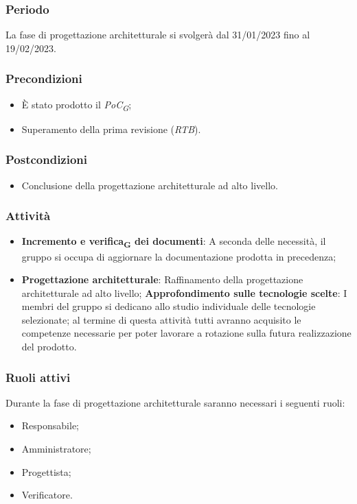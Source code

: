 \subsubsection{Periodo}
La fase di progettazione architetturale si svolgerà dal 31/01/2023 fino al 19/02/2023.

\subsubsection{Precondizioni}\:
\begin{itemize}
    \item È stato prodotto il \textit{PoC\textsubscript{G}};
    \item Superamento della prima revisione (\textit{RTB}).
\end{itemize}

\subsubsection{Postcondizioni}\:
\begin{itemize}
    \item Conclusione della progettazione architetturale ad alto livello.
\end{itemize}

\subsubsection{Attività}\:
\begin{itemize}
    \item \textbf{Incremento e verifica\textsubscript{G} dei documenti}: A seconda delle necessità, il gruppo si occupa di aggiornare la documentazione prodotta in precedenza;
    \item \textbf{Progettazione architetturale}: Raffinamento della progettazione architetturale ad alto livello;
        \subitem \textbf{Approfondimento sulle tecnologie scelte}: I membri del gruppo si dedicano allo studio individuale delle tecnologie selezionate; al termine di questa attività tutti avranno acquisito le competenze necessarie per poter lavorare a rotazione sulla futura realizzazione del prodotto.
\end{itemize}

\subsubsection{Ruoli attivi}
Durante la fase di progettazione architetturale saranno necessari i seguenti ruoli:
\begin{itemize}
	\item Responsabile;
    \item Amministratore;
    \item Progettista;
    \item Verificatore.
\end{itemize}

